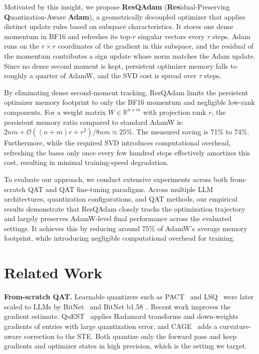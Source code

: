 \documentclass{article} %
\begin{document}
Motivated by this insight, we propose \textbf{ResQAdam} (\textbf{Res}idual-Preserving \textbf{Q}uantization-Aware \textbf{Adam}), a geometrically decoupled optimizer that applies distinct update rules based on subspace characteristics. 
It stores one dense momentum in BF16 and refreshes its top-$r$ singular vectors every $\tau$ steps. Adam runs on the $r\times r$ coordinates of the gradient in this subspace, and the residual of the momentum contributes a sign update whose norm matches the Adam update. 
Since no dense second moment is kept, persistent optimizer memory falls to roughly a quarter of AdamW, and the SVD cost is spread over $\tau$ steps.

By eliminating dense second-moment tracking, ResQAdam limits the persistent optimizer memory footprint to only the BF16 momentum and negligible low-rank components. 
For a weight matrix $W \in \mathbb{R}^{n \times m}$ with projection rank $r$, the persistent memory ratio compared to standard AdamW is:
$ 2nm + \mathcal{O}((n+m)r+r^2)/{8nm} \approx 25\% $.
The measured saving is 71\% to 74\%.
Furthermore, while the required SVD introduces computational overhead, refreshing the bases only once every few hundred steps effectively amortizes this cost, resulting in minimal training-speed degradation.

To evaluate our approach, we conduct extensive experiments across both from-scratch QAT and QAT fine-tuning paradigms. 
Across multiple LLM architectures, quantization configurations, and QAT methods, our empirical results demonstrate that ResQAdam closely tracks the optimization trajectory and largely preserves AdamW-level final performance across the evaluated settings. 
It achieves this by reducing around 75\% of AdamW's average memory footprint, while introducing negligible computational overhead for training.

\vspace{-0.1in}
\section{Related Work}
\vspace{-0.05in}
\textbf{From-scratch QAT.} Learnable quantizers such as PACT~\citep{choi2018pact} and LSQ~\citep{esser2019learned} were later scaled to LLMs by BitNet~\citep{wang2023bitnet} and BitNet b1.58~\citep{ma2024era}. Recent work improves the gradient estimate. QuEST~\citep{panferov2025quest} applies Hadamard transforms and down-weights gradients of entries with large quantization error, and CAGE~\citep{tabesh2025cage} adds a curvature-aware correction to the STE. Both quantize only the forward pass and keep gradients and optimizer states in high precision, which is the setting we target.
\end{document}
